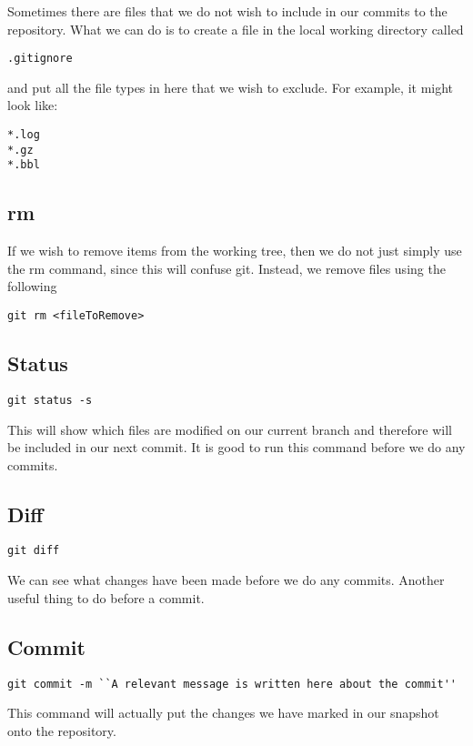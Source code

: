 \documentclass[a4paper, 10pt]{article}
\begin{document}
Sometimes there are files that we do not wish to include in our
commits to the repository. What we can do is to create a file in the
local working directory called 
\begin{verbatim}
.gitignore
\end{verbatim}
and put all the file types in here that we wish to exclude. For
example, it might look like:
\begin{verbatim}
*.log
*.gz
*.bbl
\end{verbatim}

\subsection*{rm}
\label{sec:gitrm}

If we wish to remove items from the working tree, then we do not just
simply use the rm command, since this will confuse git. Instead, we
remove files using the following
\begin{verbatim}
git rm <fileToRemove>
\end{verbatim}



\subsection*{Status}
\begin{Verbatim}
git status -s
\end{Verbatim}
This will show which files are modified on our current branch and therefore will be included in our next commit. It is good to run this command before we do any commits.


\subsection*{Diff}
\begin{Verbatim}
git diff
\end{Verbatim}
We can see what changes have been made before we do any commits. Another useful thing to do before a commit.


\subsection*{Commit}
\begin{Verbatim}
git commit -m ``A relevant message is written here about the commit''
\end{Verbatim}
This command will actually put the changes we have marked in our snapshot onto the repository.
\end{document}
